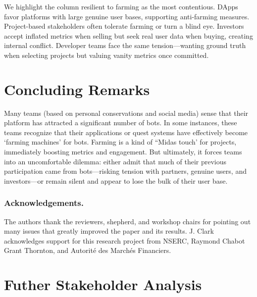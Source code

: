 We highlight the column resilient to farming as the most contentious. DApps favor platforms with large genuine user bases, supporting anti-farming measures. Project-based stakeholders often tolerate farming or turn a blind eye. Investors accept inflated metrics when selling but seek real user data when buying, creating internal conflict. Developer teams face the same tension—wanting ground truth when selecting projects but valuing vanity metrics once committed.


\section{Concluding Remarks}

Many teams (based on personal conservations and social media) sense that their platform has attracted a significant number of bots. In some instances, these teams recognize that their applications or quest systems have effectively become `farming machines' for bots. Farming is a kind of ``Midas touch' for projects, immediately boosting metrics and engagement. But ultimately, it forces teams into an uncomfortable dilemma: either admit that much of their previous participation came from bots---risking tension with partners, genuine users, and investors---or remain silent and appear to lose the bulk of their user base.


\subsubsection*{Acknowledgements.} 

The authors thank the reviewers, shepherd, and workshop chairs for pointing out many issues that greatly improved the paper and its results. J. Clark acknowledges support for this research project from NSERC, Raymond Chabot Grant Thornton, and Autorité des Marchés Financiers. 



\nocite{*}


\clearpage
\appendix

\section{Futher Stakeholder Analysis} 

